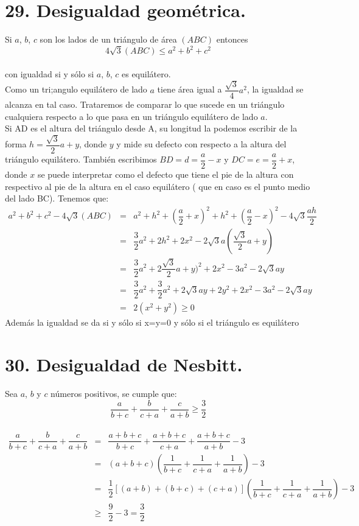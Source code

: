 \documentclass[12pt,a4paper, oneside]{book}
\begin{document}
\section{29. Desigualdad geométrica.}
Si $a$, $b$, $c$ son los lados de un triángulo de área $(ABC)$ entonces $$4\sqrt{3}(ABC) \leq a^2 + b^2 + c^2$$
\\con igualdad si y sólo si $a$, $b$, $c$ es equilátero.
\\
Como un tri;angulo equilátero de lado $a$ tiene área igual a $\dfrac{\sqrt{3}}{4}a^2$, la igualdad se alcanza en tal caso. Trataremos de comparar lo que sucede en un triángulo cualquiera respecto a lo que  pasa en  un triángulo equilátero de lado $a$. 
\\Si AD es el altura del triángulo desde A, su longitud la podemos escribir de la forma $h=\dfrac{\sqrt{3}}{2}a+y$, donde $y$ y mide su defecto con respecto a la altura del triángulo equilátero. También escribimos $BD=d=\dfrac{a}{2}-x$ y $DC=e=\dfrac{a}{2}+x$, donde $x$ se puede interpretar  como el defecto que tiene el pie de la altura con respectivo al pie de la altura en el caso equilátero ( que en caso es el punto medio del lado BC). Tenemos que:
\begin{eqnarray*}
a^2+ b^2+ c^2 -4\sqrt{3}(ABC) &=& a^2 + h^2 +(\dfrac{a}{2}+x)^2 + h^2+(\dfrac{a}{2}-x)^2- 4\sqrt{3}\dfrac{ah}{2}
\\&=& \dfrac{3}{2}a^2 +2h^2 + 2x^2 -2\sqrt{3}a(\dfrac{\sqrt{3}}{2}a+y)
\\&=&\dfrac{3}{2}a^2 + 2\dfrac{\sqrt{3}}{2}a+y)^2 +2x^2-3a^2-2\sqrt{3}ay
\\&=& \dfrac{3}{2}a^2 + \dfrac{3}{2}a^2 +2\sqrt{3}ay +2y^2+ 2x^2-3a^2- 2\sqrt{3}ay
\\&=&2(x^2+y^2)\geq 0
\end{eqnarray*}
Además la igualdad se da si y sólo si x=y=0 y sólo si el triángulo es equilátero
\section{30. Desigualdad de Nesbitt.}
Sea $a$, $b$ y $c$ números positivos, se cumple que:
$$\dfrac{a}{b+c} + \dfrac{b}{c+a}+ \dfrac{c}{a+b} \geq \dfrac{3}{2}$$
\\
\begin{eqnarray*}
\dfrac{a}{b+c}+ \dfrac{b}{c+a}+\dfrac{c}{a+b}&=&
\dfrac{a+b+c}{b+c}+\dfrac{a+b+c}{c+a}+\dfrac{a+b+c}{a+b}-3
\\&=&(a+b+c)\left(\dfrac{1}{b+c}+\dfrac{1}{c+a}+\dfrac{1}{a+b}\right)-3
\\&=&\dfrac{1}{2}[(a+b)+(b+c)+(c+a)]\left(\dfrac{1}{b+c}+\dfrac{1}{c+a}+\dfrac{1}{a+b}\right)-3
\\&\geq&\dfrac{9}{2}-3=\dfrac{3}{2}
\end{eqnarray*}
\end{document}

